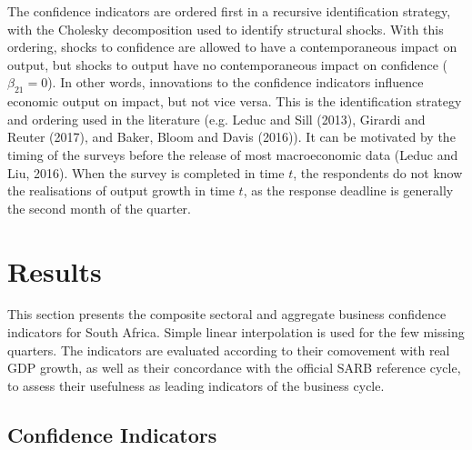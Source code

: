 \documentclass[11pt,]{article}
\begin{document}
The confidence indicators are ordered first in a recursive
identification strategy, with the Cholesky decomposition used to
identify structural shocks. With this ordering, shocks to confidence are
allowed to have a contemporaneous impact on output, but shocks to output
have no contemporaneous impact on confidence (\(\beta_{21} = 0\)). In
other words, innovations to the confidence indicators influence economic
output on impact, but not vice versa. This is the identification
strategy and ordering used in the literature (e.g. Leduc and Sill
(2013), Girardi and Reuter (2017), and Baker, Bloom and Davis (2016)).
It can be motivated by the timing of the surveys before the release of
most macroeconomic data (Leduc and Liu, 2016). When the survey is
completed in time \(t\), the respondents do not know the realisations of
output growth in time \(t\), as the response deadline is generally the
second month of the quarter.

\section{Results}\label{results}

This section presents the composite sectoral and aggregate business
confidence indicators for South Africa. Simple linear interpolation is
used for the few missing quarters. The indicators are evaluated
according to their comovement with real GDP growth, as well as their
concordance with the official SARB reference cycle, to assess their
usefulness as leading indicators of the business cycle.

\subsection{Confidence Indicators}\label{confidence-indicators}
\end{document}
